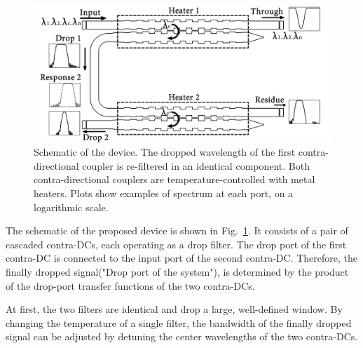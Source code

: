 \documentclass[9pt,twocolumn,twoside]{osajnl}
\begin{document}
\begin{figure}[htbp]
\centering
\includegraphics[width=1.00\columnwidth]{data/CascadedSchematic2}
\centering
\caption{Schematic of the device. 
	The dropped wavelength of the first contra-directional coupler is re-filtered in an identical component. 
	Both contra-directional couplers are temperature-controlled with metal heaters. 
	Plots show examples of spectrum at each port, on a logarithmic scale.}
\label{fig:schematic}
\end{figure}

The schematic of the proposed device is shown in Fig.~\ref{fig:schematic}. 
It consists of a pair of cascaded contra-DCs, each operating as a drop filter. 
The drop port of the first contra-DC is connected to the input port of the second contra-DC. 
Therefore, the finally dropped signal("Drop port of the system"), is determined by the product of the  drop-port transfer functions of the two contra-DCs. 

At first, the two filters are identical and drop a large, well-defined window. By changing the temperature of a single filter, the bandwidth of the finally dropped signal can be adjusted by detuning the center wavelengths of the two contra-DCs.
\end{document}
